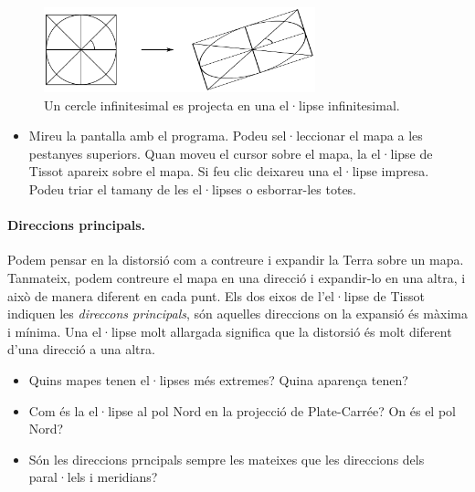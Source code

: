 \documentclass[a4paper,12pt]{article}
\begin{document}
\begin{figure}[h]
 \begin{center}
  \includegraphics[width=0.7\textwidth]{tiss_diagram} 
\caption{Un cercle infinitesimal es projecta en una el·lipse infinitesimal.}%
 \end{center}
\end{figure}
\vspace{-1em}
\begin{itemize}
 \item Mireu la pantalla amb el programa. Podeu sel·leccionar el mapa a les pestanyes superiors. Quan moveu el cursor sobre el mapa, la el·lipse de Tissot apareix sobre el mapa. Si feu clic deixareu una el·lipse impresa. Podeu triar el tamany de les el·lipses o esborrar-les totes.
 
\end{itemize}



\paragraph{Direccions principals.} 
Podem pensar en la distorsió com a contreure i expandir la Terra sobre un mapa. Tanmateix, podem contreure el mapa en una direcció i expandir-lo en una altra, i això de manera diferent en cada punt. Els dos eixos de l'el·lipse de Tissot indiquen les \emph{direccons principals}, són aquelles direccions on la expansió és màxima i mínima. Una el·lipse molt allargada significa que la distorsió és molt diferent d'una direcció a una altra.



\begin{itemize}
 \item Quins mapes tenen el·lipses més extremes? Quina aparença tenen?
 \item Com és la el·lipse al pol Nord en la projecció de Plate-Carrée? On és el pol Nord? 
 \item Són les direccions prncipals sempre les mateixes que les direccions dels paral·lels i meridians?
\end{itemize}
\end{document}
